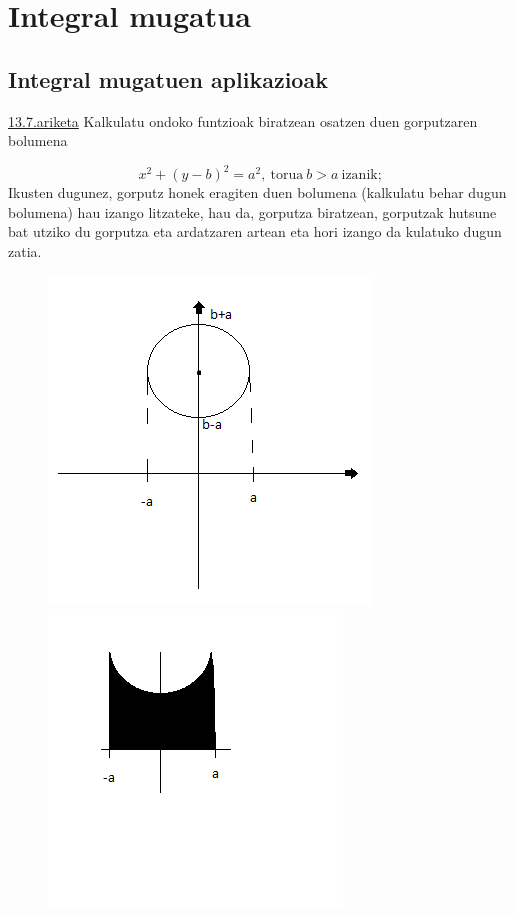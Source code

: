 \chapter{Integral mugatua}
\section{Integral mugatuen aplikazioak}
\underline{13.7.ariketa} Kalkulatu ondoko funtzioak biratzean osatzen duen gorputzaren bolumena

\begin{equation*}
    x^2+(y-b)^2=a^2,\ \text{torua}\ b>a \ \text{izanik;}
    \end{equation*}
    \newline
    Ikusten dugunez, gorputz honek eragiten duen bolumena (kalkulatu behar dugun bolumena) hau izango litzateke, hau da, gorputza biratzean, gorputzak hutsune bat utziko du gorputza eta ardatzaren artean eta hori izango da kulatuko dugun zatia. 

    
   \begin{figure}[h]
    
 \includegraphics[scale=1]{4.png}
 \includegraphics[scale=1.2]{4b.png}
    \end{figure}
    \newpage
    
